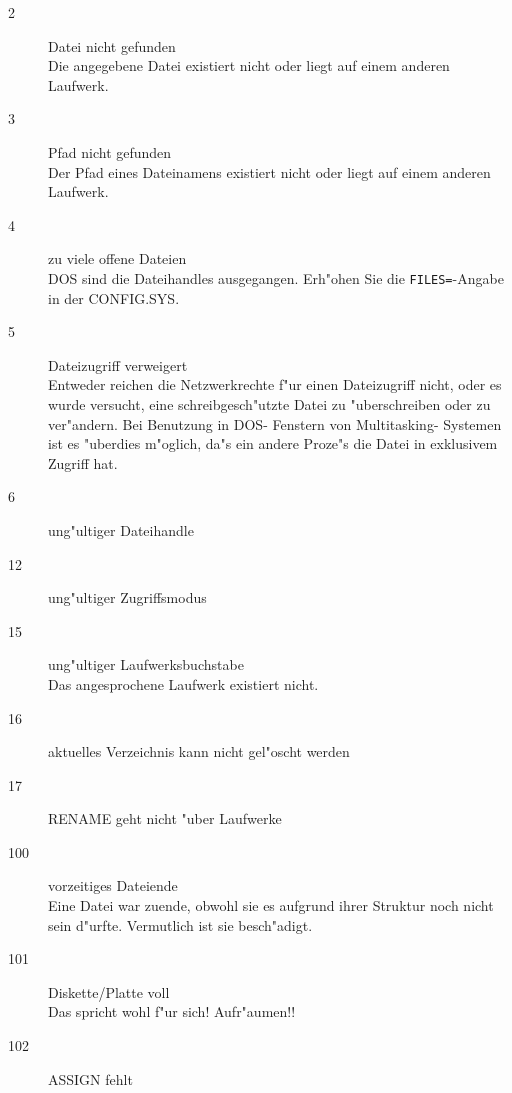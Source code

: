 \documentclass[12pt,a4paper,twoside]{report}
\newcommand{\tty}[1]{{\tt #1}}
\begin{document}
\begin{description}
\item[2]{Datei nicht gefunden\\
         Die angegebene Datei existiert nicht oder liegt auf einem
         anderen Laufwerk.}

\item[3]{Pfad nicht gefunden\\
         Der Pfad eines Dateinamens existiert nicht oder liegt auf
         einem anderen Laufwerk.}

\item[4]{zu viele offene Dateien\\
         DOS sind die Dateihandles ausgegangen.  Erh"ohen Sie die
         \tty{FILES=}-Angabe in der CONFIG.SYS.}

\item[5]{Dateizugriff verweigert\\
         Entweder reichen die Netzwerkrechte f"ur einen Dateizugriff
         nicht, oder es wur\-de ver\-sucht, ei\-ne schreib\-ge\-sch"utz\-te Da\-tei
         zu "uber\-schrei\-ben oder zu ver\-"an\-dern.  Bei Benutzung in
         DOS- Fenstern von Multitasking- Systemen ist es "uberdies m"oglich,
         da"s ein andere Proze"s die Datei in exklusivem Zugriff hat.}

\item[6]{ung"ultiger Dateihandle}

\item[12]{ung"ultiger Zugriffsmodus}

\item[15]{ung"ultiger Laufwerksbuchstabe\\
          Das angesprochene Laufwerk existiert nicht.}


\item[16]{aktuelles Verzeichnis kann nicht gel"oscht werden}

\item[17]{RENAME geht nicht "uber Laufwerke}

\item[100]{vorzeitiges Dateiende\\
           Eine Datei war zuende, obwohl sie es aufgrund ihrer Struktur
           noch nicht sein d"urfte.  Vermutlich ist sie besch"adigt.}

\item[101]{Diskette/Platte voll\\
           Das spricht wohl f"ur sich!  Aufr"aumen!!}

\item[102]{ASSIGN fehlt}


\end{description}
\end{document}

